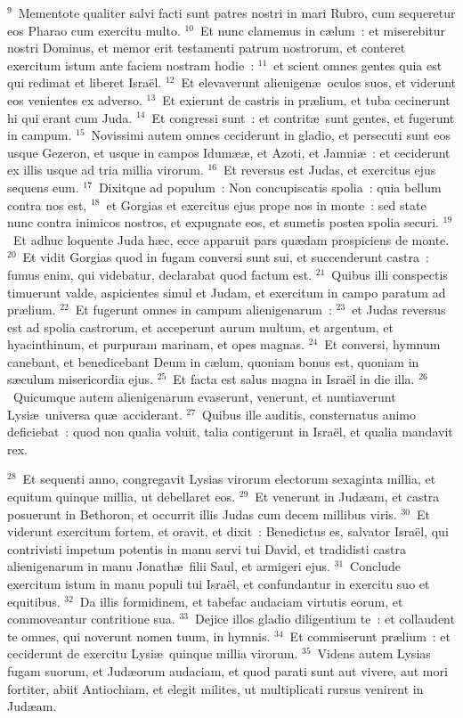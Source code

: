 ${}^{9}$~Mementote qualiter salvi facti sunt patres nostri in mari Rubro, cum sequeretur eos Pharao cum exercitu multo.
${}^{10}$~Et nunc clamemus in c\ae lum~: et miserebitur nostri Dominus, et memor erit testamenti patrum nostrorum, et conteret exercitum istum ante faciem nostram hodie~:
${}^{11}$~et scient omnes gentes quia est qui redimat et liberet Isra\"el.
${}^{12}$~Et elevaverunt alienigen\ae\ oculos suos, et viderunt eos venientes ex adverso.
${}^{13}$~Et exierunt de castris in pr\ae lium, et tuba cecinerunt hi qui erant cum Juda.
${}^{14}$~Et congressi sunt~: et contrit\ae\ sunt gentes, et fugerunt in campum.
${}^{15}$~Novissimi autem omnes ceciderunt in gladio, et persecuti sunt eos usque Gezeron, et usque in campos Idum\ae \ae , et Azoti, et Jamni\ae~: et ceciderunt ex illis usque ad tria millia virorum.
${}^{16}$~Et reversus est Judas, et exercitus ejus sequens eum.
${}^{17}$~Dixitque ad populum~: Non concupiscatis spolia~: quia bellum contra nos est,
${}^{18}$~et Gorgias et exercitus ejus prope nos in monte~: sed state nunc contra inimicos nostros, et expugnate eos, et sumetis postea spolia securi.
${}^{19}$~Et adhuc loquente Juda h\ae c, ecce apparuit pars qu\ae dam prospiciens de monte.
${}^{20}$~Et vidit Gorgias quod in fugam conversi sunt sui, et succenderunt castra~: fumus enim, qui videbatur, declarabat quod factum est.
${}^{21}$~Quibus illi conspectis timuerunt valde, aspicientes simul et Judam, et exercitum in campo paratum ad pr\ae lium.
${}^{22}$~Et fugerunt omnes in campum alienigenarum~:
${}^{23}$~et Judas reversus est ad spolia castrorum, et acceperunt aurum multum, et argentum, et hyacinthinum, et purpuram marinam, et opes magnas.
${}^{24}$~Et conversi, hymnum canebant, et benedicebant Deum in c\ae lum, quoniam bonus est, quoniam in s\ae culum misericordia ejus.
${}^{25}$~Et facta est salus magna in Isra\"el in die illa.
${}^{26}$~Quicumque autem alienigenarum evaserunt, venerunt, et nuntiaverunt Lysi\ae\ universa qu\ae\ acciderant.
${}^{27}$~Quibus ille auditis, consternatus animo deficiebat~: quod non qualia voluit, talia contigerunt in Isra\"el, et qualia mandavit rex.


${}^{28}$~Et sequenti anno, congregavit Lysias virorum electorum sexaginta millia, et equitum quinque millia, ut debellaret eos.
${}^{29}$~Et venerunt in Jud\ae am, et castra posuerunt in Bethoron, et occurrit illis Judas cum decem millibus viris.
${}^{30}$~Et viderunt exercitum fortem, et oravit, et dixit~: Benedictus es, salvator Isra\"el, qui contrivisti impetum potentis in manu servi tui David, et tradidisti castra alienigenarum in manu Jonath\ae\ filii Saul, et armigeri ejus.
${}^{31}$~Conclude exercitum istum in manu populi tui Isra\"el, et confundantur in exercitu suo et equitibus.
${}^{32}$~Da illis formidinem, et tabefac audaciam virtutis eorum, et commoveantur contritione sua.
${}^{33}$~Dejice illos gladio diligentium te~: et collaudent te omnes, qui noverunt nomen tuum, in hymnis.
${}^{34}$~Et commiserunt pr\ae lium~: et ceciderunt de exercitu Lysi\ae\ quinque millia virorum.
${}^{35}$~Videns autem Lysias fugam suorum, et Jud\ae orum audaciam, et quod parati sunt aut vivere, aut mori fortiter, abiit Antiochiam, et elegit milites, ut multiplicati rursus venirent in Jud\ae am.


